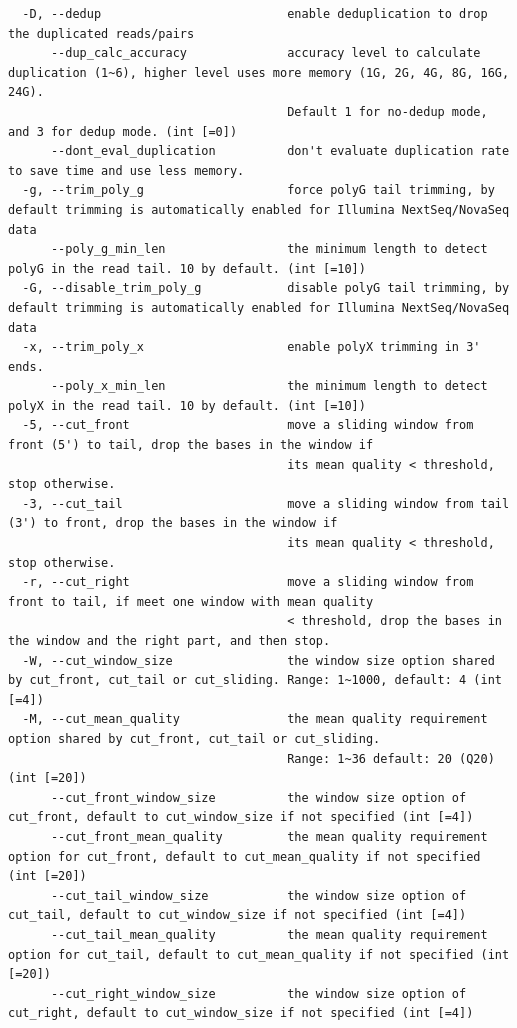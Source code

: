 \documentclass[
  letterpaper,
]{book}
\begin{document}
\begin{verbatim}
  -D, --dedup                          enable deduplication to drop the duplicated reads/pairs
      --dup_calc_accuracy              accuracy level to calculate duplication (1~6), higher level uses more memory (1G, 2G, 4G, 8G, 16G, 24G).
                                       Default 1 for no-dedup mode, and 3 for dedup mode. (int [=0])
      --dont_eval_duplication          don't evaluate duplication rate to save time and use less memory.
  -g, --trim_poly_g                    force polyG tail trimming, by default trimming is automatically enabled for Illumina NextSeq/NovaSeq data
      --poly_g_min_len                 the minimum length to detect polyG in the read tail. 10 by default. (int [=10])
  -G, --disable_trim_poly_g            disable polyG tail trimming, by default trimming is automatically enabled for Illumina NextSeq/NovaSeq data
  -x, --trim_poly_x                    enable polyX trimming in 3' ends.
      --poly_x_min_len                 the minimum length to detect polyX in the read tail. 10 by default. (int [=10])
  -5, --cut_front                      move a sliding window from front (5') to tail, drop the bases in the window if
                                       its mean quality < threshold, stop otherwise.
  -3, --cut_tail                       move a sliding window from tail (3') to front, drop the bases in the window if
                                       its mean quality < threshold, stop otherwise.
  -r, --cut_right                      move a sliding window from front to tail, if meet one window with mean quality
                                       < threshold, drop the bases in the window and the right part, and then stop.
  -W, --cut_window_size                the window size option shared by cut_front, cut_tail or cut_sliding. Range: 1~1000, default: 4 (int [=4])
  -M, --cut_mean_quality               the mean quality requirement option shared by cut_front, cut_tail or cut_sliding.
                                       Range: 1~36 default: 20 (Q20) (int [=20])
      --cut_front_window_size          the window size option of cut_front, default to cut_window_size if not specified (int [=4])
      --cut_front_mean_quality         the mean quality requirement option for cut_front, default to cut_mean_quality if not specified (int [=20])
      --cut_tail_window_size           the window size option of cut_tail, default to cut_window_size if not specified (int [=4])
      --cut_tail_mean_quality          the mean quality requirement option for cut_tail, default to cut_mean_quality if not specified (int [=20])
      --cut_right_window_size          the window size option of cut_right, default to cut_window_size if not specified (int [=4])

\end{verbatim}
\end{document}
